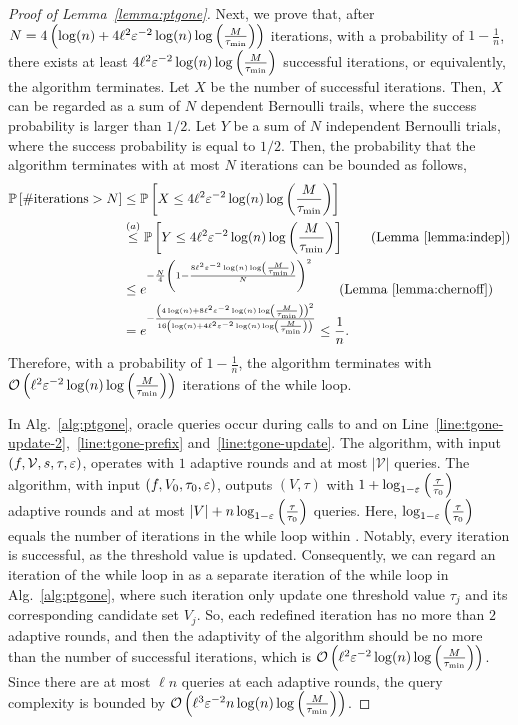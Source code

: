 \begin{proof}[Proof of Lemma~\ref{lemma:ptgone}]
Next, we prove that, after $N=4\left(\log(n)+ 4\ell^2\varepsilon^{-2}\log(n)\log\left(\frac{M}{\tau_{\min}}\right)\right)$ iterations,
with a probability of $1-\frac{1}{n}$,
there exists at least $4\ell^2\varepsilon^{-2}\log(n)\log\left(\frac{M}{\tau_{\min}}\right)$
successful iterations,
or equivalently, the algorithm terminates.
Let $X$ be the number of successful iterations.
Then, $X$ can be regarded as a sum of $N$ dependent Bernoulli trails,
where the success probability is larger than $1/2$.
Let $Y$ be a sum of $N$ independent Bernoulli trials,
where the success probability is equal to $1/2$.
Then, the probability that the algorithm terminates with at most $N$ iterations can be bounded as follows,
\begin{align*}
\prob{\#\text{iterations} > N} &\le \prob{X \le 4\ell^2\epsi^{-2}\log(n)\log\left(\frac{M}{\tau_{\min}}\right)} \\
& \overset{(a)}{\le} \prob{Y \le 4\ell^2\epsi^{-2}\log(n)\log\left(\frac{M}{\tau_{\min}}\right)}\tag{Lemma~\ref{lemma:indep}}\\
&\le e^{- \frac{N}{4}\left(1-\frac{8\ell^2\epsi^{-2}\log(n)\log\left(\frac{M}{\tau_{\min}}\right)}{N}\right)^2} \tag{Lemma~\ref{lemma:chernoff}}\\
&= e^{-\frac{\left(4\log(n)+ 8\ell^2\epsi^{-2}\log(n)\log\left(\frac{M}{\tau_{\min}}\right)\right)^2}{16\left(\log(n)+ 4\ell^2\epsi^{-2}\log(n)\log\left(\frac{M}{\tau_{\min}}\right)\right)}} \le \frac{1}{n}.
\end{align*}
Therefore, with a probability of $1-\frac{1}{n}$,
the algorithm terminates with $\mathcal O \left( \ell^2\varepsilon^{-2}\log(n)\log\left(\frac{M}{\tau_{\min}}\right) \right)$ iterations of the while loop.

In Alg.~\ref{alg:ptgone}, oracle queries occur during calls
to \update and \prefix 
on Line~\ref{line:tgone-update-2},~\ref{line:tgone-prefix} and~\ref{line:tgone-update}.
The \prefix algorithm,
with input $(f, \mathcal V, s, \tau, \varepsilon)$,
operates with $1$ adaptive rounds
and at most $|\mathcal V|$ queries.
The \update algorithm,
with input $(f, V_0, \tau_0, \varepsilon)$, 
outputs $(V, \tau)$
with $1+\log_{1-\varepsilon}\left(\frac{\tau}{\tau_0}\right)$ adaptive rounds
and at most $|V| + n\log_{1-\varepsilon}\left(\frac{\tau}{\tau_0}\right)$ queries.
Here, $\log_{1-\varepsilon}\left(\frac{\tau}{\tau_0}\right)$ equals the number of iterations in the while loop within \update.
Notably, every iteration is successful,
as the threshold value is updated.
Consequently, we can regard an iteration of the while loop in \update
as a separate iteration of the while loop in Alg.~\ref{alg:ptgone},
where such iteration only update one threshold value $\tau_j$ and its corresponding candidate set $V_j$.
So, each redefined iteration has no more than $2$ adaptive rounds,
and then the adaptivity of the algorithm should be no more than 
the number of successful iterations, which is
$\mathcal O \left( \ell^2\varepsilon^{-2}\log(n)\log\left(\frac{M}{\tau_{\min}}\right) \right)$.
Since there are at most $\ell n$ queries at each adaptive rounds,
the query complexity is bounded by $\mathcal O \left( \ell^3\varepsilon^{-2}n\log(n)\log\left(\frac{M}{\tau_{\min}}\right) \right)$.


\end{proof}
